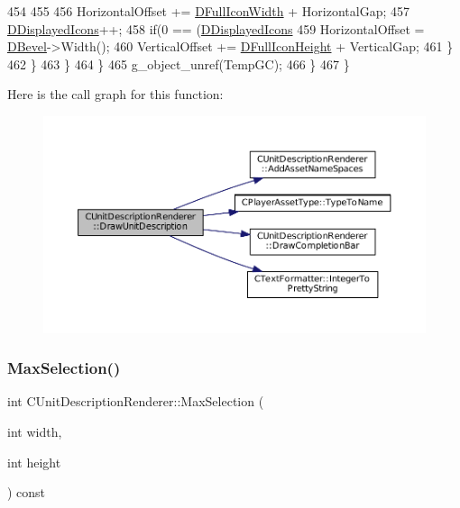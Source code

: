 \begin{DoxyCode}
454                     
455                     
456                     HorizontalOffset += \hyperlink{classCUnitDescriptionRenderer_a4bd79032fe13b9c09386a24cb8ef7650}{DFullIconWidth} + HorizontalGap;
457                     \hyperlink{classCUnitDescriptionRenderer_a0f2d234d02c615ac28812508c77ec414}{DDisplayedIcons}++;
458                     \textcolor{keywordflow}{if}(0 == (\hyperlink{classCUnitDescriptionRenderer_a0f2d234d02c615ac28812508c77ec414}{DDisplayedIcons} %
459                         HorizontalOffset = \hyperlink{classCUnitDescriptionRenderer_a9f4cd9f9d8dbc5036c885980494db41e}{DBevel}->Width();
460                         VerticalOffset +=  \hyperlink{classCUnitDescriptionRenderer_ae9f7d843d0eabd4b1f1b19bfa5332754}{DFullIconHeight} + VerticalGap;
461                     \}
462                 \}
463             \}
464         \}
465         g\_object\_unref(TempGC);
466     \}
467 \}
\end{DoxyCode}
Here is the call graph for this function\+:\nopagebreak
\begin{figure}[H]
\begin{center}
\leavevmode
\includegraphics[width=350pt]{classCUnitDescriptionRenderer_a129cfc5d3942ebc37b9ca51530bf4daa_cgraph}
\end{center}
\end{figure}
\hypertarget{classCUnitDescriptionRenderer_a13289f29576ca1e55ed910aa7fef76e2}{}\label{classCUnitDescriptionRenderer_a13289f29576ca1e55ed910aa7fef76e2} 
\subsubsection{\texorpdfstring{Max\+Selection()}{MaxSelection()}}
{\footnotesize\ttfamily int C\+Unit\+Description\+Renderer\+::\+Max\+Selection (\begin{DoxyParamCaption}\item[{int}]{width,  }\item[{int}]{height }\end{DoxyParamCaption}) const}



